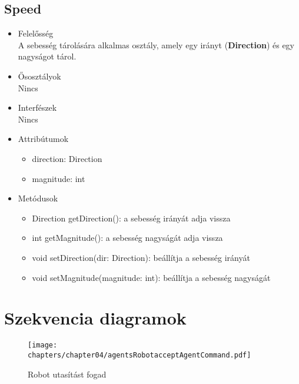 \subsection{Speed}
\begin{itemize}

\item Felelősség\\
    A sebesség tárolására alkalmas osztály, amely egy irányt (\textbf{Direction}) és egy nagyságot tárol.

\item Ősosztályok\\
Nincs

\item Interfészek\\
Nincs

\item Attribútumok\\
\begin{itemize}
    \item direction: Direction
    \item magnitude: int

\end{itemize}

\item Metódusok\\

\begin{itemize}
    \item Direction getDirection(): a sebesség irányát adja vissza
    \item int getMagnitude(): a sebesség nagyságát adja vissza
    \item void setDirection(dir: Direction): beállítja a sebesség irányát
    \item void setMagnitude(magnitude: int): beállítja a sebesség nagyságát
\end{itemize}

\end{itemize}

\clearpage



\section{Szekvencia diagramok}

\begin{figure}[h]
	\begin{center}
		\texttt{[image: chapters/chapter04/agentsRobotacceptAgentCommand.pdf]}
		\caption{Robot utasítást fogad}
		\label{fig:agents.Robot.accept}
	\end{center}
\end{figure}

